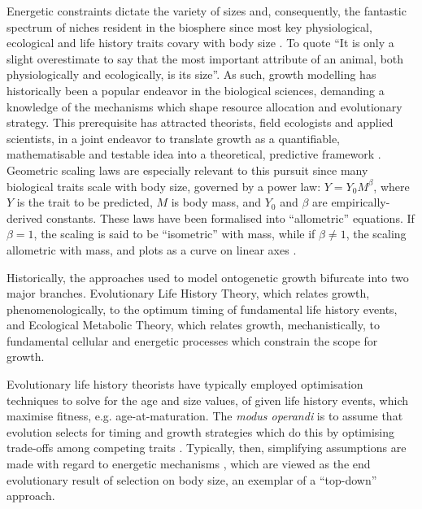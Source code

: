 \documentclass[a4paper]{article} %
\begin{document}
    Energetic constraints dictate the variety of sizes and, consequently, the fantastic spectrum of niches resident in the biosphere since most key physiological, ecological and life history traits covary with body size \autocite{peters1983, brown2000-scaling-book,schmidt1984scaling,Marshall2019b}. To quote \textcite{Bartholomew1981} ``It is only a slight overestimate to say that the most important attribute of an animal, both physiologically and ecologically, is its size''. As such, growth modelling has historically been a popular endeavor in the biological sciences, demanding a knowledge of the mechanisms which shape resource allocation and evolutionary strategy. This prerequisite has attracted theorists, field ecologists and applied scientists, in a joint endeavor to translate growth as a quantifiable, mathematisable and testable idea into a theoretical, predictive framework \autocite{popper1962,popper1972,peters1983, West2011}. Geometric scaling laws are especially relevant to this pursuit since many biological traits scale with body size, governed by a power law: $Y = Y_0 M^{\beta}$, where $Y$ is the trait to be predicted, $M$ is body mass, and $Y_0$ and $\beta$ are empirically-derived constants. These laws have been formalised into ``allometric'' equations. If $\beta = 1$, the scaling is said to be ``isometric'' with mass, while if $\beta \neq 1$, the scaling allometric with mass, and plots as a curve on linear axes \autocite{brown2000-scaling-book}.

    Historically, the approaches used to model ontogenetic growth bifurcate into two major branches. Evolutionary Life History Theory, which relates growth, phenomenologically, to the optimum timing of fundamental life history events, and Ecological Metabolic Theory, which relates growth, mechanistically, to fundamental cellular and energetic processes which constrain the scope for growth.
        
    Evolutionary life history theorists have typically employed optimisation techniques to solve for the age and size values, of given life history events, which maximise fitness, e.g. age-at-maturation. The \textit{modus operandi} is to assume that evolution selects for timing and growth strategies which do this by optimising trade-offs among competing traits \autocite{Day1997, Stearns1989, stearns1992evolution}. Typically, then, simplifying assumptions are made with regard to energetic mechanisms \autocite{Day1997, Kozowski1987-indeterminate}, which are viewed as the end evolutionary result of selection on body size, an exemplar of a ``top-down'' approach.
        
\end{document}
